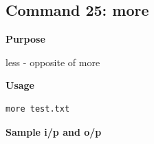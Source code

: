 \subsection{Command 25: more} 
\textbf{Purpose}
\begin{flushleft}
       less - opposite of more
\end{flushleft}
\textbf{Usage}
\begin{verbatim}
more test.txt
\end{verbatim}
\textbf{Sample i/p and o/p}
\begin{figure}[H] 
\end{figure}
